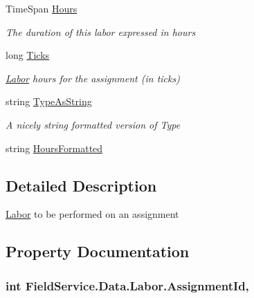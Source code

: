 \begin{DoxyCompactItemize}
Time\+Span \hyperlink{class_field_service_1_1_data_1_1_labor_a9e525f27f4946eb2346cc14edf524f3b}{Hours}
\begin{DoxyCompactList}\small\item\em The duration of this labor expressed in hours \end{DoxyCompactList}\item 
long \hyperlink{class_field_service_1_1_data_1_1_labor_a47ddd79856595414a77eca93b1f00716}{Ticks}
\begin{DoxyCompactList}\small\item\em \hyperlink{class_field_service_1_1_data_1_1_labor}{Labor} hours for the assignment (in ticks) \end{DoxyCompactList}\item 
string \hyperlink{class_field_service_1_1_data_1_1_labor_a184db30b7e0d531260e740d6b705f327}{Type\+As\+String}
\begin{DoxyCompactList}\small\item\em A nicely string formatted version of Type \end{DoxyCompactList}\item 
string \hyperlink{class_field_service_1_1_data_1_1_labor_abeebb1b52562440896e8e7f13637bf11}{Hours\+Formatted}
\end{DoxyCompactItemize}


\subsection{Detailed Description}
\hyperlink{class_field_service_1_1_data_1_1_labor}{Labor} to be performed on an assignment 



\subsection{Property Documentation}
\hypertarget{class_field_service_1_1_data_1_1_labor_ab4ddefede34c7053b77e2232315a36c9}{
\subsubsection[{Assignment\+Id}]{\setlength{\rightskip}{0pt plus 5cm}int Field\+Service.\+Data.\+Labor.\+Assignment\+Id\hspace{0.3cm}{\ttfamily [get]}, {\ttfamily [set]}}}\label{class_field_service_1_1_data_1_1_labor_ab4ddefede34c7053b77e2232315a36c9}


